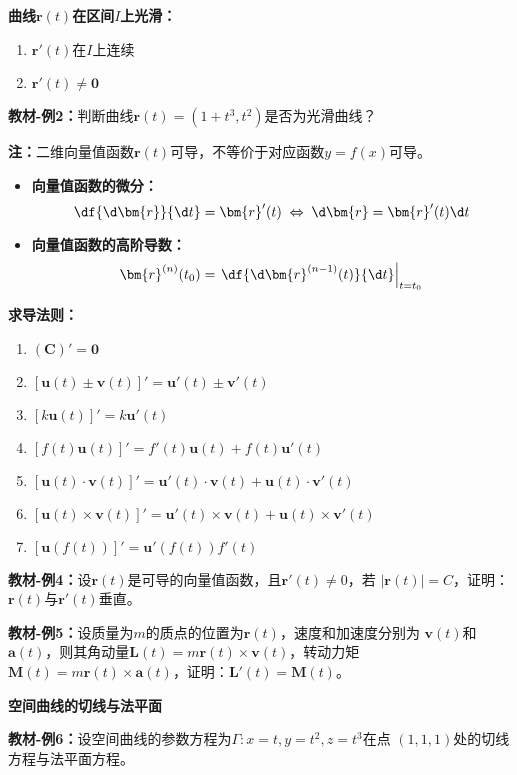 {\bf 曲线$\bm{r}(t)$在区间$I$上光滑：}
\begin{enumerate}[(1)]
  \setlength{\itemindent}{1cm}
  \item $\bm{r}'(t)$在$I$上连续
  \item $\bm{r}'(t)\ne \bm{0}$
\end{enumerate}

{\bf 教材-例2：}判断曲线$\bm{r}(t)=(1+t^3,t^2)$是否为光滑曲线？

{\bf 注：}二维向量值函数$\bm{r}(t)$可导，不等价于对应函数$y=f(x)$可导。

\begin{itemize}
  \setlength{\itemindent}{1cm}
  \item {\bf 向量值函数的微分：}
  $$\df{\d\bm{r}}{\d t}=\bm{r}'(t)\;\Leftrightarrow\;
  \d\bm{r}=\bm{r}'(t)\d t$$
  \item {\bf 向量值函数的高阶导数：}
  $$\bm{r}^{(n)}(t_0)=\left.\df{\d\bm{r}^{(n-1)}(t)}{\d t}\right|_{t=t_0}$$
\end{itemize}

{\bf 求导法则：}

\begin{enumerate} 
  \item $(\bm{C})'=\bm{0}$ 
  \item $[\bm{u}(t)\pm\bm{v}(t)]'=\bm{u}'(t)\pm\bm{v}'(t)$ 
  \item $[k\bm{u}(t)]'=k\bm{u}'(t)$ 
  \item $[f(t)\bm{u}(t)]'=f'(t)\bm{u}(t)+f(t)\bm{u}'(t)$ 
  \item {$[\bm{u}(t)\cdot\bm{v}(t)]'=\bm{u}'(t)\cdot\bm{v}(t)
  +\bm{u}(t)\cdot\bm{v}'(t)$} 
  \item {$[\bm{u}(t)\times\bm{v}(t)]'=\bm{u}'(t)\times\bm{v}(t)
  +\bm{u}(t)\times\bm{v}'(t)$} 
  \item $[\bm{u}(f(t))]'=\bm{u}'(f(t))f'(t)$ 
\end{enumerate}

{\bf 教材-例4：}设$\bm{r}(t)$是可导的向量值函数，且$\bm{r}'(t)\ne 0$，若
$|\bm{r}(t)|=C$，证明：$\bm{r}(t)$与$\bm{r}'(t)$垂直。

{\bf 教材-例5：}设质量为$m$的质点的位置为$\bm{r}(t)$，速度和加速度分别为
$\bm{v}(t)$和$\bm{a}(t)$，则其角动量$\bm{L}(t)
=m\bm{r}(t)\times\bm{v}(t)$，转动力矩$\bm{M}(t)=m\bm{r}(t)
\times\bm{a}(t)$，证明：$\bm{L}'(t)=\bm{M}(t)$。

{\bf 空间曲线的切线与法平面}

{\bf 教材-例6：}设空间曲线的参数方程为$\Gamma:x=t,y=t^2,z=t^3$在点
$(1,1,1)$处的切线方程与法平面方程。

